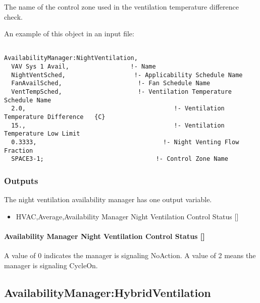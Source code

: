 The name of the control zone used in the ventilation temperature difference check.

An example of this object in an input file:

\begin{lstlisting}

AvailabilityManager:NightVentilation,
  VAV Sys 1 Avail,                 !- Name
  NightVentSched,                   !- Applicability Schedule Name
  FanAvailSched,                     !- Fan Schedule Name
  VentTempSched,                     !- Ventilation Temperature Schedule Name
  2.0,                                         !- Ventilation Temperature Difference   {C}
  15.,                                         !- Ventilation Temperature Low Limit
  0.3333,                                   !- Night Venting Flow Fraction
  SPACE3-1;                               !- Control Zone Name
\end{lstlisting}

\subsubsection{Outputs}\label{outputs-8-008}

The night ventilation availability manager has one output variable.

\begin{itemize}
\tightlist
\item
  HVAC,Average,Availability Manager Night Ventilation Control Status {[]}
\end{itemize}

\paragraph{Availability Manager Night Ventilation Control Status {[]}}\label{availability-manager-night-ventilation-control-status}

A value of 0 indicates the manager is signaling NoAction. A value of 2 means the manager is signaling CycleOn.

\subsection{AvailabilityManager:HybridVentilation}\label{availabilitymanagerhybridventilation}

